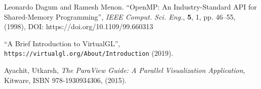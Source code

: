 \documentclass[twoside,a4paper,12pt,english]{inac19}
\begin{document}
\begin{thebibliography}{99}
   Leonardo Dagum and Ramesh Menon. ``OpenMP: An Industry-Standard API for Shared-Memory Programming'', \textit{IEEE Comput. Sci. Eng.}, \textbf{5}, 1, pp. 46--55, (1998), DOI: https://doi.org/10.1109/99.660313 

 ``A Brief Introduction to VirtualGL'', \verb#https://virtualgl.org/About/Introduction# (2019).

 Ayachit, Utkarsh, \textit{The ParaView Guide: A Parallel Visualization Application}, Kitware, ISBN 978-1930934306, (2015).
  
  
    
\end{thebibliography}

%
%
\end{document}
